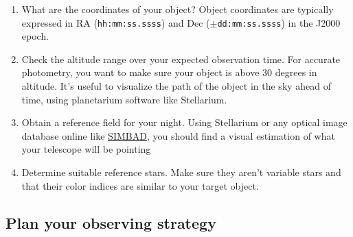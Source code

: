\documentclass{article}
\begin{document}
			\begin{enumerate}
				
				\item What are the coordinates of your object? Object coordinates are typically expressed in RA (\texttt{hh:mm:ss.ssss}) and Dec (\texttt{$\pm$dd:mm:ss.ssss}) in the J2000 epoch.
				
				\item Check the altitude range over your expected observation time. For accurate photometry, you want to make sure your object is above 30 degrees in altitude. It's useful to visualize the path of the object in the sky ahead of time, using planetarium software like Stellarium.
				
				\item Obtain a reference field for your night. Using Stellarium or any optical image database online like \href{http://simbad.u-strasbg.fr/simbad/}{SIMBAD}, you should find a visual estimation of what your telescope will be pointing
				
				\item Determine suitable reference stars. Make sure they aren't variable stars and that their color indices are similar to your target object.
				
			\end{enumerate}
			
		\subsection{Plan your observing strategy}
		
\end{document}
